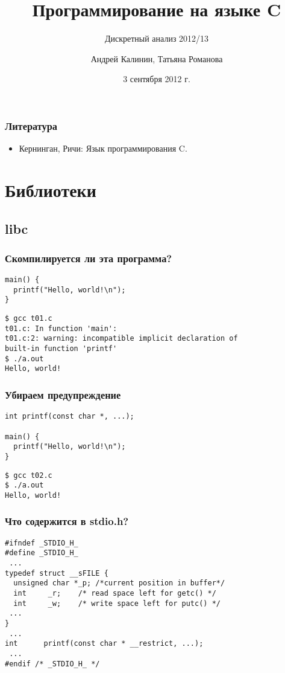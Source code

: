 \documentclass[hyperref={unicode=true}]{beamer}
\title{Программирование на языке C}
\subtitle{Дискретный анализ 2012/13}
\author{Андрей Калинин, Татьяна Романова}
\date{3 сентября 2012 г.}
\begin{document}
\frame{\titlepage}

\frame{\tableofcontents}

\frame
{
  \frametitle{Литература}

  \begin{itemize}
  \item Кернинган, Ричи: Язык программирования C.
  \end{itemize}
}
\lstset{language=C}

\section{Библиотеки}

\subsection{libc} 

\begin{frame}[fragile]
\frametitle{Скомпилируется ли эта программа?}
\begin{lstlisting}
main() {
  printf("Hello, world!\n");
}
\end{lstlisting} \pause
\begin{verbatim}
$ gcc t01.c 
t01.c: In function 'main':
t01.c:2: warning: incompatible implicit declaration of 
built-in function 'printf'
$ ./a.out
Hello, world!
\end{verbatim}
\end{frame}

\begin{frame}[fragile]
\frametitle{Убираем предупреждение}
\begin{lstlisting}
int printf(const char *, ...);

main() {
  printf("Hello, world!\n");
}
\end{lstlisting} 
\begin{verbatim}
$ gcc t02.c 
$ ./a.out
Hello, world!
\end{verbatim}
\end{frame}

\begin{frame}[fragile]
\frametitle{Что содержится в stdio.h?}
\begin{lstlisting}
#ifndef _STDIO_H_
#define _STDIO_H_
 ...
typedef struct __sFILE {
  unsigned char *_p; /*current position in buffer*/
  int     _r;    /* read space left for getc() */
  int     _w;    /* write space left for putc() */
 ...
}
 ...
int      printf(const char * __restrict, ...);
 ...
#endif /* _STDIO_H_ */
\end{lstlisting}
\end{frame}
\end{document}

